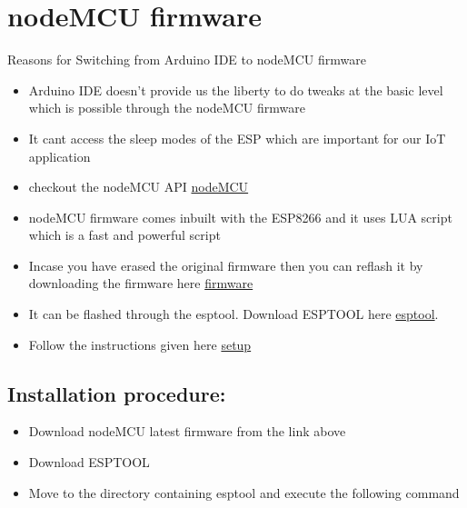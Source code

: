 \documentclass[16pt]{article}
\begin{document}
\vspace{19cm}
\section{nodeMCU firmware}
\vspace{0.5cm}

Reasons for Switching from Arduino IDE to nodeMCU firmware

\begin{itemize}

\item
  Arduino IDE doesn't provide us the liberty to do tweaks at the basic
  level which is possible through the nodeMCU firmware
\item
  It cant access the sleep modes of the ESP which are important for our
  IoT application
\item
  checkout the nodeMCU API
  {\color{red}\href{https://github.com/nodemcu/nodemcu-firmware/wiki/nodemcu_api_en}{nodeMCU}}
\item
  nodeMCU firmware comes inbuilt with the ESP8266 and it uses LUA script
  which is a fast and powerful script
\item
  Incase you have erased the original firmware then you can reflash it
  by downloading the firmware here
  {\color{red}\href{https://github.com/nodemcu/nodemcu-firmware/raw/master/pre_build/latest/nodemcu_latest.bin}{firmware}}
\item
  It can be flashed through the esptool. Download ESPTOOL here
  {\color{red}\href{https://github.com/themadinventor/esptool/}{esptool}}.
\item
  Follow the instructions given here
  {\color{red}\href{http://www.whatimade.today/flashing-the-nodemcu-firmware-on-the-esp8266-linux-guide/}{setup}}
 
\end{itemize}

\subsection{Installation procedure:}

\begin{itemize}

\item
  Download nodeMCU latest firmware from the link above 
\item
  Download ESPTOOL
\item
  Move to the directory containing esptool and execute the following
  command
\end{itemize}
\end{document}
